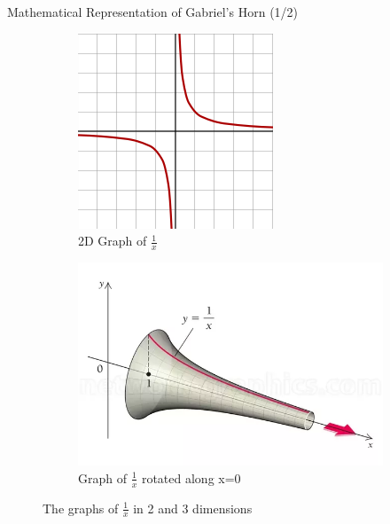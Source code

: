 \documentclass{beamer}
\begin{document}
\begin{frame}{Mathematical Representation of Gabriel's Horn (1/2)}
\begin{figure}[h]
    \centering
    \begin{subfigure}[b]{0.4\linewidth}
      \includegraphics[width=\linewidth]{Graph 1.png}
      \caption{2D Graph of $\frac{1}{x}$}
    \end{subfigure}
    \hspace{4mm}
    \begin{subfigure}[b]{0.4\linewidth}
      \includegraphics[width=\linewidth]{Graph 2.png}
      \caption{Graph of $\frac{1}{x}$ rotated along x=0}
      \begin{minipage}{.1cm}
      \vfill
      \end{minipage}
    \end{subfigure}
    \caption{The graphs of $\frac{1}{x}$ in 2 and 3 dimensions}
    \label{fig:my_label}
\end{figure}
\end{frame}
\end{document}

